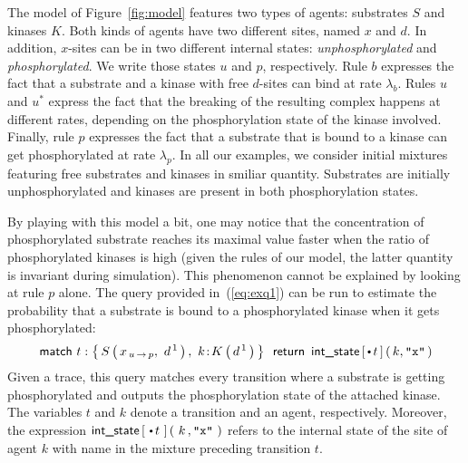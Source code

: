 \documentclass[runningheads]{llncs}
\begin{document}
The model of Figure~\ref{fig:model} features two types of agents:
substrates $S$ and kinases $K$. Both kinds of agents have two
different sites, named $x$ and $d$. In addition, $x$-sites can be in
two different internal states: \textit{unphosphorylated} and
\textit{phosphorylated}. We write those states $u$ and $p$,
respectively. Rule $b$ expresses the fact that a substrate and a
kinase with free $d$-sites can bind at rate $\lambda_b$. Rules $u$ and
$u^*$ express the fact that the breaking of the resulting complex
happens at different rates, depending on the phosphorylation state of
the kinase involved. Finally, rule $p$ expresses the fact that a
substrate that is bound to a kinase can get phosphorylated at rate
$\lambda_p$. In all our examples, we consider initial mixtures
featuring free substrates and kinases in smiliar quantity. Substrates
are initially unphosphorylated and kinases are present in both
phosphorylation states.




By playing with this model a bit, one may notice that the
concentration of phosphorylated substrate reaches its maximal value
faster when the ratio of phosphorylated kinases is high (given the
rules of our model, the latter quantity is invariant during
simulation). This phenomenon cannot be explained by looking at rule
$p$ alone. The query provided in~(\ref{eq:exq1}) can be run to
estimate the probability that a substrate is bound to a phosphorylated
kinase when it gets phosphorylated:
\begin{equation}\label{eq:exq1}
  \m{match } t:\Set{ \AG{S}{x_{\Trans{u}{p}},\ d^{\,1}},\ \iAG{k}{K}{d^{\,1}} }
  \, \m{ return } \, \IntState{\StateBefore{t}}{k}{\STR{x}}
\end{equation}
Given a trace, this query matches every transition where a substrate
is getting phosphorylated and outputs the phosphorylation state of the
attached kinase. The variables $t$ and $k$ denote a transition and an
agent, respectively. Moreover, the expression
$\IntState{\,\StateBefore{t}\,}{\,k\,}{\STR{x}\,}$ refers to the
internal state of the site of agent $k$ with name  in the
mixture preceding transition $t$.
\end{document}
